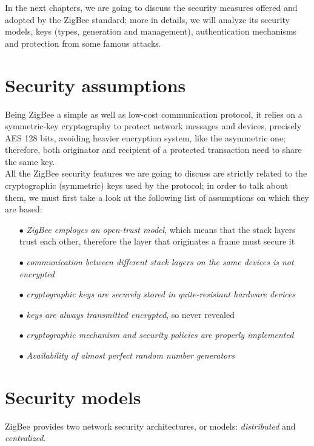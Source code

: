 \documentclass[12pt]{report}
\begin{document}
{{In the next chapters, we are going to discuss the security measures offered and adopted by the ZigBee standard; more in details, we will analyze its security models, keys (types, generation and management), authentication mechanisms and protection from some famous attacks.\\


\clearpage
\section{Security assumptions}
\bigskip
Being ZigBee a simple as well as low-cost communication protocol, it relies on a symmetric-key cryptography to protect network messages and devices, precisely AES 128 bits, avoiding heavier encryption system, like the asymmetric one; therefore, both originator and recipient of a protected transaction need to share the same key.\\
All the ZigBee security features we are going to discuss are strictly related to the cryptographic (symmetric) keys used by the protocol; in order to talk about them, we must first take a look at the following list of assumptions on which they are based:

\begin{itemize}
\setlength{\itemindent}{+4mm}
\item[$\bullet$] \emph{ZigBee employes an open-trust model}, which means that the stack layers trust each other, therefore the layer that originates a frame must secure it
\item[$\bullet$] \emph{communication between different stack layers on the same devices is not encrypted}
\item[$\bullet$] \emph{cryptographic keys are securely stored in quite-resistant hardware devices}
\item[$\bullet$] \emph{keys are always transmitted encrypted}, so never revealed
\item[$\bullet$] \emph{cryptographic mechanism and security policies are properly implemented}
\item[$\bullet$] \emph{Availability of almost perfect random number generators}\\
\end{itemize}

\clearpage
\section{Security models}
\bigskip

ZigBee provides two network security architectures, or models: \emph{distributed} and \emph{centralized}.\\

}}
\end{document}
